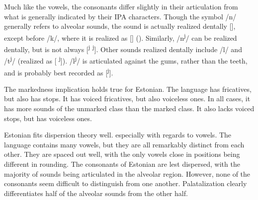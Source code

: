 \documentclass[doc]{apa6}
\begin{document}
Much like the vowels, the consonants differ slightly in their articulation from what is generally indicated by their IPA characters.
Though the symbol /n/ generally refers to alveolar sounds, the sound is actually realized dentally [], except before /k/, where it is realized as [] ().
Similarly, /n\textsuperscript{j}/ can be realized dentally, but is not always [\textsuperscript{j} \textsuperscript{j}].
Other sounds realized dentally include /l/ and /t\textsuperscript{j}/ (realized as [ \textsuperscript{j}]).
/l\textsuperscript{j}/ is articulated against the gums, rather than the teeth, and is probably best recorded as [\textsuperscript{j}].

The markedness implication holds true for Estonian. The language has fricatives, but also has stops. It has voiced fricatives, but also voiceless ones. In all cases, it has more sounds of the unmarked class than the marked class. It also lacks voiced stops, but has voiceless ones.

Estonian fits dispersion theory well. especially with regards to vowels. The language contains many vowels, but they are all remarkably distinct from each other. They are spaced out well, with the only vowels close in positions being different in rounding.
The consonants of Estonian are lest dispersed, with the majority of sounds being articulated in the alveolar region. However, none of the consonants seem difficult to distinguish from one another. Palatalization clearly differentiates half of the alveolar sounds from the other half.
\end{document}

